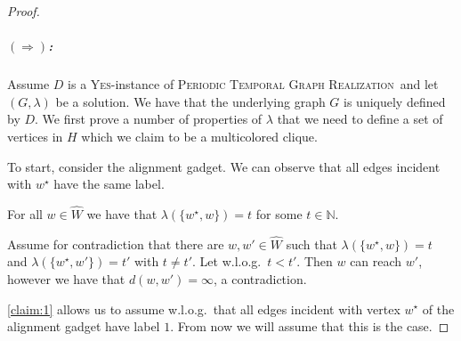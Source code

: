 \documentclass[a4paper,UKenglish,cleveref, autoref, thm-restate]{lipics-v2021}
\newcommand{\deltaExactLong}{\textsc{Periodic Temporal Graph Realization}}
\begin{document}
\begin{proof}
\subparagraph{$(\Rightarrow)$:} Assume $D$ is a \textsc{Yes}-instance of \deltaExactLong\ and let $(G,\lambda)$ be a solution. We have that the underlying graph $G$ is uniquely defined by $D$. We first prove a number of properties of $\lambda$ that we need to define a set of vertices in $H$ which we claim to be a multicolored clique.

To start, consider the alignment gadget. We can observe that all edges incident with $w^\star$ have the same label.
\begin{claim}\label{claim:1}
    For all $w\in \hat{W}$ we have that $\lambda(\{w^\star,w\})=t$ for some $t\in\mathbb{N}$.
\end{claim}
\begin{claimproof}
    Assume for contradiction that there are $w,w'\in \hat{W}$ such that $\lambda(\{w^\star,w\})=t$ and $\lambda(\{w^\star,w'\})=t'$ with $t\neq t'$. Let w.l.o.g.\ $t<t'$. Then $w$ can reach $w'$, however we have that $d(w,w')=\infty$, a contradiction.
\end{claimproof}
\cref{claim:1} allows us to assume w.l.o.g.\ that all edges incident with vertex $w^\star$ of the alignment gadget have label $1$. From now we will assume that this is the case.


\end{proof}
\end{document}
